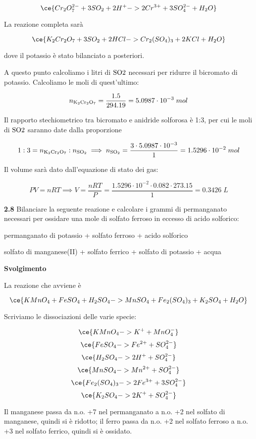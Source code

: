 $$\ce{Cr_2O_7^{2-} + 3SO_2 + 2H^+ -> 2Cr^{3+} + 3SO_4^{2-} + H_2O}$$

La reazione completa sarà

$$\ce{K_2Cr_2O_7 + 3SO_2 + 2HCl -> Cr_2(SO_4)_3 + 2KCl + H_2O}$$

dove il potassio è stato bilanciato a posteriori.

A questo punto calcoliamo i litri di $\rm SO2$ necessari per ridurre il bicromato di potassio. Calcoliamo le moli di quest'ultimo:

$$n_{\rm K_2Cr_2O_7}=\frac{1.5}{294.19}
=5.0987 \cdot 10^{-3}\;mol$$

Il rapporto stechiometrico tra bicromato e anidride solforosa è 1:3, per cui le moli di $\rm SO2$ saranno date dalla proporzione

$$1:3=n_{\rm K_2Cr_2O_7}:n_{\rm SO_2}
\implies
n_{\rm SO_2}=\frac{3 \cdot 5.0987 \cdot 10^{-3}}{1}
=1.5296 \cdot 10^{-2}\;mol$$

Il volume sarà dato dall'equazione di stato dei gas:

$$PV=nRT
\implies
V=\frac{nRT}{P}=\frac{1.5296 \cdot 10^{-2} \cdot 0.082 \cdot 273.15}{1}=0.3426\;L$$



\vspace{0.2cm}\textbf{2.8} Bilanciare la seguente reazione e calcolare i grammi di permanganato necessari per ossidare una
mole di solfato ferroso in eccesso di acido solforico:

\begin{center}
permanganato di potassio + solfato ferroso + acido solforico \ce{->}

\ce{->}solfato di manganese(II) + solfato ferrico + solfato di potassio + acqua
\end{center}

\large\textbf{Svolgimento}\normalsize

\vspace{0.2cm}La reazione che avviene è

$$\ce{KMnO_4 + FeSO_4 + H_2SO_4 -> MnSO_4 + Fe_2(SO_4)_3 + K_2SO_4 + H_2O}$$

Scriviamo le dissociazioni delle varie specie:

$$\ce{KMnO_4 -> K^+ + MnO_4^-}$$
$$\ce{FeSO_4 -> Fe^{2+} + SO_4^{2-}}$$
$$\ce{H_2SO_4 -> 2H^+ + SO_4^{2-}}$$
$$\ce{MnSO_4 -> Mn^{2+} + SO_4^{2-}}$$
$$\ce{Fe_2(SO_4)_3 -> 2Fe^{3+} + 3SO_4^{2-}}$$
$$\ce{K_2SO_4 -> 2K^+ + SO_4^{2-}}$$

Il manganese passa da n.o. +7 nel permanganato a n.o. +2 nel solfato di manganese, quindi si è ridotto; il ferro passa da n.o. +2 nel solfato ferroso a n.o. +3 nel solfato ferrico, quindi si è ossidato.

